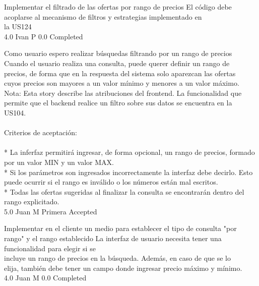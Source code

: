 		{Implementar el filtrado de las ofertas por rango de precios} %
		{El código debe acoplarse al mecanismo de filtros y estrategias implementado en\\
la US124\\
} %
		{4.0} %
		{Ivan P} %
		{0.0} %
		{Completed} %


\vspace{20pt}

	{Como usuario espero realizar búsquedas filtrando por un rango de precios} %
	{Cuando el usuario realiza una consulta, puede querer definir un rango de\\
precios, de forma que en la respuesta del sistema solo aparezcan las ofertas\\
cuyos precios son mayores a un valor mínimo y menores a un valor máximo.\\
Nota: Esta story describe las atribuciones del frontend. La funcionalidad que\\
permite que el backend realice un filtro sobre sus datos se encuentra en la\\
US104.\\
  \\
Criterios de aceptación:\\
  \\
* La inferfaz permitirá ingresar, de forma opcional, un rango de precios, formado por un valor MIN y un valor MAX.  \\
* Si los parámetros son ingresados incorrectamente la interfaz debe decirlo. Esto puede ocurrir si el rango es inválido o los números están mal escritos.\\
* Todas las ofertas sugeridas al finalizar la consulta se encontrarán dentro del rango explicitado.  \\
} %
	{} %
	{5.0} %
	{Juan M} %
	{Primera} %
	{Accepted} %

		{Implementar en el cliente un medio para establecer el tipo de consulta "por rango" y el rango establecido} %
		{La interfaz de usuario necesita tener una funcionalidad para elegir si se\\
incluye un rango de precios en la búsqueda. Además, en caso de que se lo\\
elija, también debe tener un campo donde ingresar precio máximo y mínimo.\\
} %
		{4.0} %
		{Juan M} %
		{0.0} %
		{Completed} %

